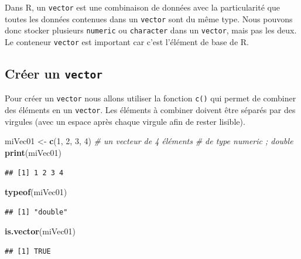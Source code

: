 \documentclass[twoside,symmetric]{book}
\newenvironment{Shaded}{}{}
\newcommand{\CommentTok}[1]{\textit{#1}}
\newcommand{\DecValTok}[1]{#1}
\newcommand{\KeywordTok}[1]{\textbf{#1}}
\newcommand{\NormalTok}[1]{#1}
\newcommand{\StringTok}[1]{#1}
\begin{document}
Dans R, un \texttt{vector} est une combinaison de données avec la particularité que toutes les données contenues dans un \texttt{vector} sont du même type. Nous pouvons donc stocker plusieurs \texttt{numeric} ou \texttt{character} dans un \texttt{vector}, mais pas les deux. Le conteneur \texttt{vector} est important car c'est l'élément de base de R.

\hypertarget{cruxe9er-un-vector}{%
\subsection{\texorpdfstring{Créer un \texttt{vector}}{Créer un vector}}\label{cruxe9er-un-vector}}

Pour créer un \texttt{vector} nous allons utiliser la fonction \texttt{c()} qui permet de combiner des éléments en un \texttt{vector}. Les éléments à combiner doivent être séparés par des virgules (avec un espace après chaque virgule afin de rester lisible).

\begin{Shaded}
\begin{Highlighting}[]
\NormalTok{miVec01 <-}\StringTok{ }\KeywordTok{c}\NormalTok{(}\DecValTok{1}\NormalTok{, }\DecValTok{2}\NormalTok{, }\DecValTok{3}\NormalTok{, }\DecValTok{4}\NormalTok{) }\CommentTok{# un vecteur de 4 éléments }
                         \CommentTok{# de type numeric ; double}
\KeywordTok{print}\NormalTok{(miVec01)}
\end{Highlighting}
\end{Shaded}

\begin{verbatim}
## [1] 1 2 3 4
\end{verbatim}

\begin{Shaded}
\begin{Highlighting}[]
\KeywordTok{typeof}\NormalTok{(miVec01)}
\end{Highlighting}
\end{Shaded}

\begin{verbatim}
## [1] "double"
\end{verbatim}

\begin{Shaded}
\begin{Highlighting}[]
\KeywordTok{is.vector}\NormalTok{(miVec01)}
\end{Highlighting}
\end{Shaded}

\begin{verbatim}
## [1] TRUE
\end{verbatim}
\end{document}
